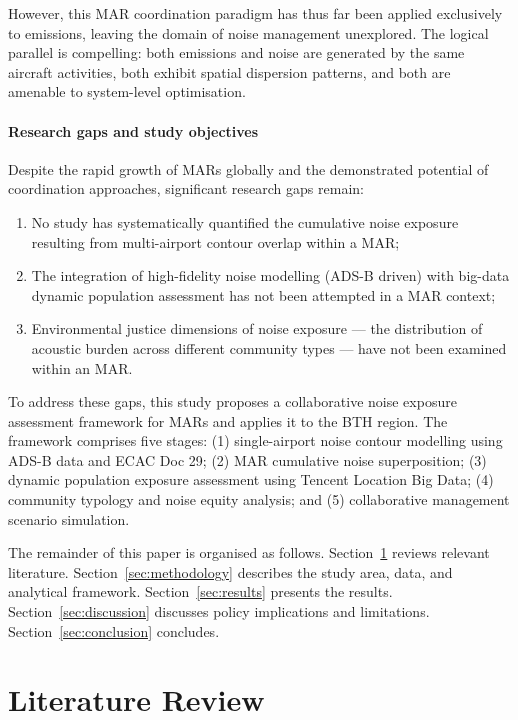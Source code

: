 \documentclass[review,12pt]{elsarticle}
\begin{document}
However, this MAR coordination paradigm has thus far been applied exclusively to emissions, leaving the domain of noise management unexplored. The logical parallel is compelling: both emissions and noise are generated by the same aircraft activities, both exhibit spatial dispersion patterns, and both are amenable to system-level optimisation.

\paragraph{Research gaps and study objectives}

Despite the rapid growth of MARs globally and the demonstrated potential of coordination approaches, significant research gaps remain:

\begin{enumerate}
    \itemsep0em
    \item No study has systematically quantified the cumulative noise exposure resulting from multi-airport contour overlap within a MAR;
    \item The integration of high-fidelity noise modelling (ADS-B driven) with big-data dynamic population assessment has not been attempted in a MAR context;
    \item Environmental justice dimensions of noise exposure --- the distribution of acoustic burden across different community types --- have not been examined within an MAR.
\end{enumerate}

To address these gaps, this study proposes a collaborative noise exposure assessment framework for MARs and applies it to the BTH region. The framework comprises five stages: (1) single-airport noise contour modelling using ADS-B data and ECAC Doc 29; (2) MAR cumulative noise superposition; (3) dynamic population exposure assessment using Tencent Location Big Data; (4) community typology and noise equity analysis; and (5) collaborative management scenario simulation.

The remainder of this paper is organised as follows. Section~\ref{sec:literature} reviews relevant literature. Section~\ref{sec:methodology} describes the study area, data, and analytical framework. Section~\ref{sec:results} presents the results. Section~\ref{sec:discussion} discusses policy implications and limitations. Section~\ref{sec:conclusion} concludes.

\section{Literature Review}
\label{sec:literature}
\end{document}
